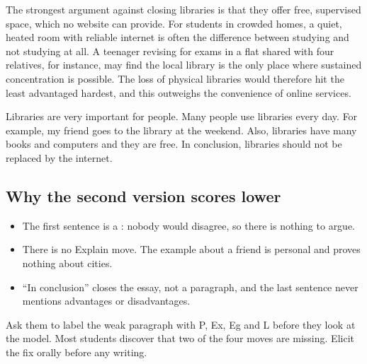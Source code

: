 \documentclass[chinese]{tutordesk}
\begin{document}
\begin{compare}
\begin{example}
The strongest argument against closing libraries is that they offer free,
supervised space, which no website can provide.
For students in crowded homes, a quiet, heated room with reliable internet is
often the difference between studying and not studying at all.
A teenager revising for exams in a flat shared with four relatives, for instance,
may find the local library is the only place where sustained concentration is possible.
The loss of physical libraries would therefore hit the least advantaged hardest,
and this outweighs the convenience of online services.
\end{example}
\begin{nonexample}
Libraries are very important for people. Many people use libraries every day.
For example, my friend goes to the library at the weekend. Also, libraries have many
books and computers and they are free. In conclusion, libraries should not be replaced
by the internet.
\end{nonexample}
\end{compare}

\subsection{Why the second version scores lower}
\begin{itemize}
  \item The first sentence is a : nobody would disagree, so there is nothing to argue.
  \item There is no Explain move. The example about a friend is personal and proves nothing about cities.
  \item “In conclusion” closes the essay, not a paragraph, and the last sentence never mentions advantages or disadvantages.
\end{itemize}

\begin{teachernote}
Ask them to label the weak paragraph with P, Ex, Eg and L before they look at the model.
Most students discover that two of the four moves are missing. Elicit the fix orally
before any writing.
\end{teachernote}
\end{document}
